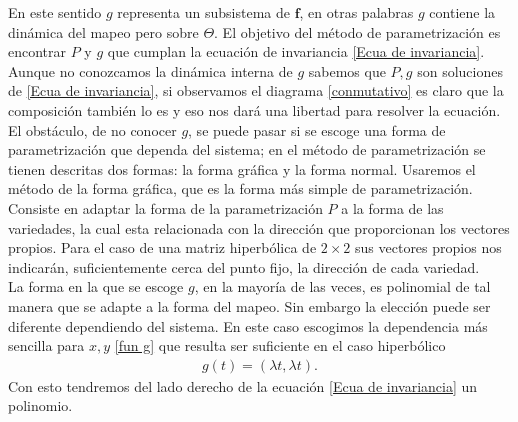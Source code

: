 En este sentido $g$ representa un subsistema de $\mathbf{f}$, en otras palabras $g$ contiene la dinámica del mapeo pero sobre $\Theta$. El objetivo del método de parametrización es encontrar $P$ y $g$ que cumplan la ecuación de invariancia \eqref{Ecua de invariancia}. Aunque no conozcamos la dinámica interna de $g$ sabemos que $P,g$ son soluciones de \eqref{Ecua de invariancia}, si observamos el diagrama \eqref{conmutativo} es claro que la composición también lo es y eso nos dará una libertad para resolver la ecuación. El obstáculo, de no conocer $g$, se puede pasar si se escoge una forma de parametrización que dependa del sistema; en el método de parametrización se tienen descritas dos formas: la forma gráfica y la forma normal. Usaremos el método de la forma gráfica, que es la forma más simple de parametrización. Consiste en adaptar la forma de la parametrización $P$ a la forma de las variedades, la cual esta relacionada con la dirección que proporcionan los vectores propios. Para el caso de una matriz hiperbólica de $2\times 2$ sus vectores propios nos indicarán, suficientemente cerca del punto fijo, la dirección de cada variedad. \\


La forma en la que se escoge $g$, en la mayoría de las veces, es polinomial de tal manera que se adapte a la forma del mapeo. Sin embargo la elección puede ser diferente dependiendo del sistema. En este caso escogimos la dependencia más sencilla para $x,y$ \eqref{fun g} que resulta ser suficiente en el caso hiperbólico
\begin{eqnarray}
g(t) = (\lambda t,\lambda t).
\label{fun g}
\end{eqnarray}
Con esto tendremos del lado derecho de la ecuación \eqref{Ecua de invariancia} un polinomio. \\

